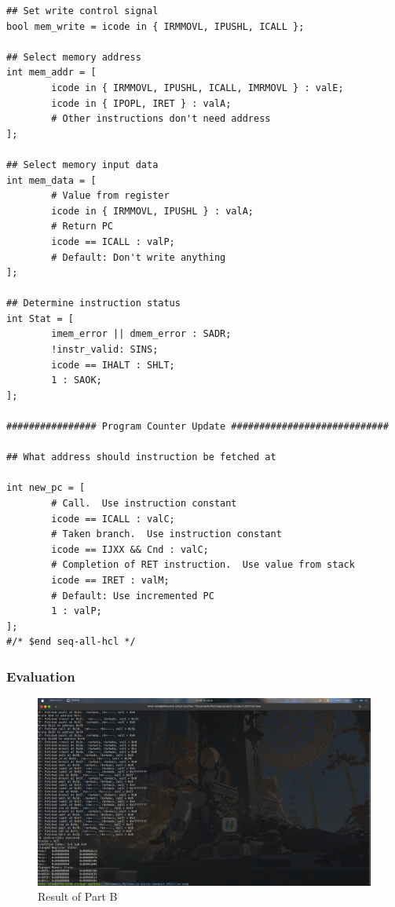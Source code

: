 \documentclass{article}
\begin{document}
\begin{lstlisting}[caption={seq-full.hcl}, label={cd:seq}]
## Set write control signal
bool mem_write = icode in { IRMMOVL, IPUSHL, ICALL };

## Select memory address
int mem_addr = [
        icode in { IRMMOVL, IPUSHL, ICALL, IMRMOVL } : valE;
        icode in { IPOPL, IRET } : valA;
        # Other instructions don't need address
];

## Select memory input data
int mem_data = [
        # Value from register
        icode in { IRMMOVL, IPUSHL } : valA;
        # Return PC
        icode == ICALL : valP;
        # Default: Don't write anything
];

## Determine instruction status
int Stat = [
        imem_error || dmem_error : SADR;
        !instr_valid: SINS;
        icode == IHALT : SHLT;
        1 : SAOK;
];

################ Program Counter Update ############################

## What address should instruction be fetched at

int new_pc = [
        # Call.  Use instruction constant
        icode == ICALL : valC;
        # Taken branch.  Use instruction constant
        icode == IJXX && Cnd : valC;
        # Completion of RET instruction.  Use value from stack
        icode == IRET : valM;
        # Default: Use incremented PC
        1 : valP;
];
#/* $end seq-all-hcl */
\end{lstlisting}

\subsubsection{Evaluation}
\begin{figure}[htbp]
\centering
\includegraphics[width=1\textwidth]{figure/ptb.png}
\caption{Result of Part B}
\label{fig:seq}
\end{figure} 
\end{document}
